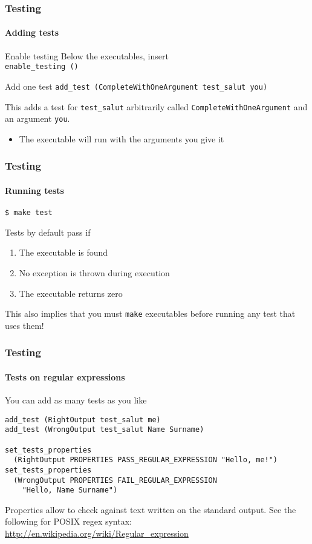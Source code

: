 \begin{frame}
\frametitle{Testing}
\framesubtitle{Adding tests}

\begin{block}{Enable testing}
Below the executables, insert \\
\texttt{enable\_testing ()}
\end{block}

\begin{block}{Add one test}
\texttt{add\_test (CompleteWithOneArgument test\_salut you)} 

\medskip

This adds a test for \texttt{test\_salut} arbitrarily called \texttt{CompleteWithOneArgument} and an argument \texttt{you}.
\begin{itemize}
\item The executable will run with the arguments you give it
\end{itemize}
\end{block}

\end{frame}

\begin{frame}
\frametitle{Testing}
\framesubtitle{Running tests}

\texttt{\$ make test}

\bigskip

\begin{block}{Tests by default pass if}
\begin{enumerate}
\item The executable is found
\item No exception is thrown during execution
\item The executable returns zero
\end{enumerate}
This also implies that you must \texttt{make} executables before running any test that uses them!
\end{block}

\end{frame}

\begin{frame}[fragile]
\frametitle{Testing}
\framesubtitle{Tests on regular expressions}

\begin{block}{You can add as many tests as you like}
{\scriptsize
\begin{verbatim}
add_test (RightOutput test_salut me)
add_test (WrongOutput test_salut Name Surname)

set_tests_properties 
  (RightOutput PROPERTIES PASS_REGULAR_EXPRESSION "Hello, me!")
set_tests_properties 
  (WrongOutput PROPERTIES FAIL_REGULAR_EXPRESSION
    "Hello, Name Surname")
\end{verbatim}
}
Properties allow to check against text written on the standard output. See the following for POSIX regex syntax: \url{http://en.wikipedia.org/wiki/Regular_expression}
\end{block}

\end{frame}

